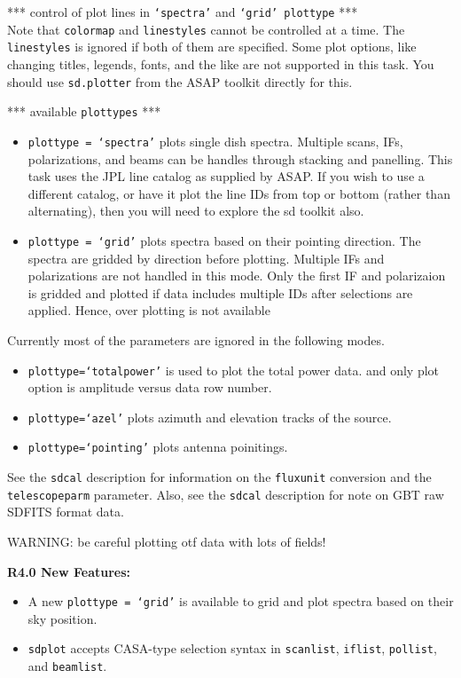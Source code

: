 *** control of plot lines in {\tt `spectra'} and {\tt `grid' plottype} ***\\
Note that {\tt colormap} and {\tt linestyles} cannot be controlled at a time.
The {\tt linestyles} is ignored if both of them are specified.
Some plot options, like changing titles, legends, fonts,
and the like are not supported in this task.  You should use
{\tt sd.plotter} from the ASAP toolkit directly for this.

*** available {\tt plottypes} ***
\begin{itemize}
\item {\tt plottype = `spectra'} plots single dish spectra. Multiple scans,
IFs, polarizations, and beams can be handles through stacking
and panelling.
This task uses the JPL line catalog as supplied by ASAP.
If you wish to use a different catalog, or have it plot
the line IDs from top or bottom (rather than alternating),
then you will need to explore the sd toolkit also.
\item {\tt plottype = `grid'} plots spectra based on their pointing direction.
The spectra are gridded by direction before plotting.
Multiple IFs and polarizations are not handled in this mode. Only
the first IF and polarizaion is gridded and plotted if data 
includes multiple IDs after selections are applied. Hence, over
plotting is not available
\end{itemize}

Currently most of the parameters are ignored in the following modes.
\begin{itemize}
\item {\tt plottype=`totalpower'} is used to plot the total power data.
and only plot option is amplitude versus data row number.
\item {\tt plottype=`azel'} plots azimuth and elevation tracks of the source.
\item {\tt plottype=`pointing'} plots antenna poinitings.
\end{itemize}

See the {\tt sdcal} description for information on the {\tt fluxunit} conversion
and the {\tt telescopeparm} parameter.
Also, see the {\tt sdcal} description for note on GBT raw SDFITS format data.

WARNING: be careful plotting otf data with lots of fields!

\medskip  
{\bf R4.0 New Features:}
\begin{itemize}
\item A new {\tt plottype = \lq grid\rq} is available to grid and plot spectra based
on their sky position.
\item {\tt sdplot} accepts CASA-type selection syntax in {\tt scanlist}, {\tt iflist},
{\tt pollist}, and {\tt beamlist}.
\end{itemize}

